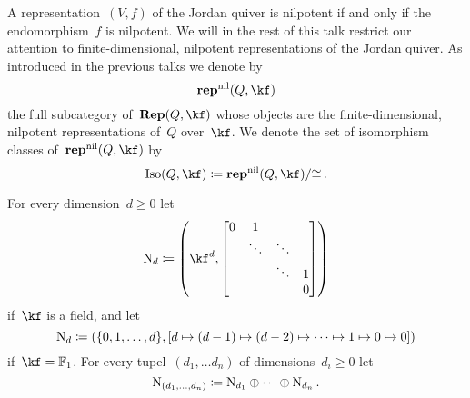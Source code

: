 \documentclass[a4paper, 11pt, twoside=semi]{scrartcl}
\begin{document}
A representation~$(V, f)$ of the Jordan quiver is nilpotent if and only if the endomorphism~$f$ is nilpotent.
We will in the rest of this talk restrict our attention to finite-dimensional, nilpotent representations of the Jordan quiver.
As introduced in the previous talks we denote by
\[
  \repnil(Q, \kf)
\]
the full subcategory of~$\Rep(Q, \kf)$ whose objects are the finite-dimensional, nilpotent representations of~$Q$ over~$\kf$.
We denote the set of isomorphism classes of~$\repnil(Q, \kf)$ by
\[
  \Iso(Q, \kf)
  \defined
  \repnil(Q, \kf) / {\cong} \,.
\]

\begin{definition}
  For every dimension~$d \geq 0$ let
  \[
    \Nil_d
    \defined
    \left(
      \kf^d,
      \begin{bmatrix}
        0 & 1       &         &   \\
          & \ddots  & \ddots  &   \\
          &         & \ddots  & 1 \\
          &         &         & 0
      \end{bmatrix}
    \right)
  \]
  if~$\kf$ is a field, and let
  \[
    \mathrm{N}_d
    \coloneqq
    (
      \{ 0, 1, \dotsc, d \},
      [d \mapsto (d-1) \mapsto (d-2) \mapsto \dotsb \mapsto 1 \mapsto 0 \mapsto 0]
    )
  \]
  if~$\kf = \Finite_1$.
  For every tupel~$(d_1, \dotsc d_n)$ of dimensions~$d_i \geq 0$ let
  \[
    \mathrm{N}_{(d_1, \dotsc, d_n)}
    \coloneqq
    \mathrm{N}_{d_1} \oplus \dotsb \oplus \mathrm{N}_{d_n} \,.
  \]
\end{definition}
\end{document}
